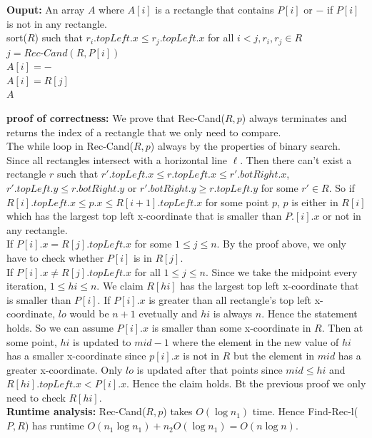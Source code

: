\documentclass[11pt]{article}
\begin{document}
\begin{enumerate}
\begin{enumerate}
\begin{algorithm} [h]
     {
        \textbf{Ouput:} An array $A$ where $A[i]$ is a rectangle that contains $P[i]$ or $-$ if $P[i]$ is not in 
        any rectangle.\\
        sort($R$) such that $r_i.topLeft.x \leq r_j.topLeft.x$ for all $i < j, r_i, r_j \in R$\\
         {
            $j = Rec$-$Cand(R, P[i])$\\
             {
                $A[i] = -$\\
            } {
                $A[i] = R[j]$\\
            } 
        }
        \Return $A$
    }
\end{algorithm}
\textbf{proof of correctness:} We prove that Rec-Cand($R, p$) always terminates and returns the index of  
a rectangle that we only need to compare. \\
The while loop in Rec-Cand($R, p$) always by the properties of binary search.\\
Since all rectangles intersect with a horizontal line $\ell$. Then there can't exist a rectangle $r$ such that 
$r'.topLeft.x \leq r.topLeft.x \leq r'.botRight.x$, $r'.topLeft.y \leq r.botRight.y$ or 
$r'.botRight.y \geq r.topLeft.y$ for some $r' \in R$. So if $R[i].topLeft.x \leq p.x \leq R[i + 1].topLeft.x$ 
for some point $p$, $p$ is either in $R[i]$ which has the largest top left x-coordinate that is smaller than 
$P.[i].x$ or not in any rectangle.\\
If $P[i].x = R[j].topLeft.x$ for some $1 \leq j \leq n$. By the proof above, we only have to check 
whether $P[i]$ is in $R[j]$.\\
If $P[i].x \neq R[j].topLeft.x$ for all $1 \leq j \leq n$. Since we take the midpoint every iteration, 
$1 \leq hi \leq n$. We claim $R[hi]$ has the largest top left x-coordinate that is smaller than $P[i]$. If 
$P[i].x$ is greater than all rectangle's top left x-coordinate, $lo$ would be $n + 1$ evetually and $hi$ is 
always $n$. Hence the statement holds. So we can assume $P[i].x$ is smaller than some x-coordinate in $R$. 
Then at some point, $hi$ is updated to $mid - 1$ where the element in the new value of $hi$ has a smaller 
x-coordinate since $p[i].x$ is not in $R$ but the element in $mid$ has a greater x-coordinate. Only $lo$ 
is updated after that points since $mid \leq hi$ and $R[hi].topLeft.x < P[i].x$. Hence the claim holds.
Bt the previous proof we only need to check $R[hi]$.\\
\textbf{Runtime analysis:} Rec-Cand($R, p$) takes $O(\log n_1)$ time. Hence Find-Rec-l($P, R$) has runtime 
$O(n_1 \log n_1) + n_2 O(\log n_1) = O(n \log n)$.


\end{enumerate}
\end{enumerate}
\end{document}
